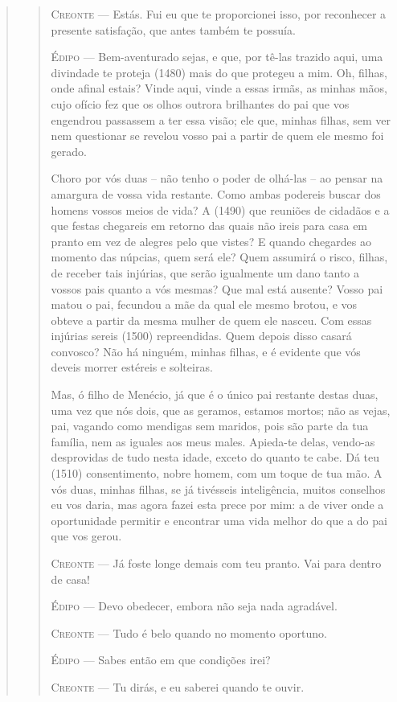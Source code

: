 \begin{verse}
\begin{verse}
\textsc{Creonte} --- Estás. Fui eu que te proporcionei isso, por reconhecer a presente
satisfação, que antes também te possuía.

\textsc{Édipo} --- Bem-aventurado sejas, e que, por tê-las trazido aqui, uma divindade te
proteja (1480) mais do que protegeu a mim. Oh, filhas, onde afinal
estais? Vinde aqui, vinde a essas irmãs, as minhas mãos, cujo ofício fez
que os olhos outrora brilhantes do pai que vos engendrou passassem a ter
essa visão; ele que, minhas filhas, sem ver nem questionar se revelou
vosso pai a partir de quem ele mesmo foi gerado.

Choro por vós duas -- não tenho o poder de olhá-las -- ao pensar na
amargura de vossa vida restante. Como ambas podereis buscar dos homens
vossos meios de vida? A (1490) que reuniões de cidadãos e a que festas
chegareis em retorno das quais não ireis para casa em pranto em vez de
alegres pelo que vistes? E quando chegardes ao momento das núpcias, quem
será ele? Quem assumirá o risco, filhas, de receber tais injúrias, que
serão igualmente um dano tanto a vossos pais quanto a vós mesmas? Que
mal está ausente? Vosso pai matou o pai, fecundou a mãe da qual ele
mesmo brotou, e vos obteve a partir da mesma mulher de quem ele nasceu.
Com essas injúrias sereis (1500) repreendidas. Quem depois disso casará
convosco? Não há ninguém, minhas filhas, e é evidente que vós deveis
morrer estéreis e solteiras.

Mas, ó filho de Menécio, já que é o único pai restante destas duas, uma
vez que nós dois, que as geramos, estamos mortos; não as vejas, pai,
vagando como mendigas sem maridos, pois são parte da tua família, nem as
iguales aos meus males. Apieda-te delas, vendo-as desprovidas de tudo
nesta idade, exceto do quanto te cabe. Dá teu (1510) consentimento,
nobre homem, com um toque de tua mão. A vós duas, minhas filhas, se já
tivésseis inteligência, muitos conselhos eu vos daria, mas agora fazei
esta prece por mim: a de viver onde a oportunidade permitir e encontrar
uma vida melhor do que a do pai que vos gerou.

\textsc{Creonte} --- Já foste longe demais com teu pranto. Vai para dentro de casa!

\textsc{Édipo} --- Devo obedecer, embora não seja nada agradável.

\textsc{Creonte} --- Tudo é belo quando no momento oportuno.

\textsc{Édipo} --- Sabes então em que condições irei?

\textsc{Creonte} --- Tu dirás, e eu saberei quando te ouvir.


\end{verse}
\end{verse}
